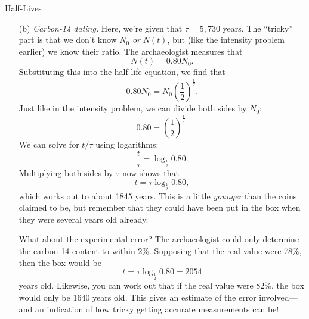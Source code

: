 \documentclass[12pt]{article}
\begin{document}
\begin{probdesc}{7}{Half-Lives}
\begin{enumerate}
\item[(b)] {\em Carbon-14 dating.} Here, we're given that $\tau =
  5,730$ years.  The ``tricky'' part is that we don't know $N_0$ {\em
  or} $N(t)$, but (like the intensity problem earlier) we know their
  ratio.  The archaeologist measures that
\begin{equation}
N(t) = 0.80 N_0.
\end{equation}
Substituting this into the half-life equation, we find that
\begin{equation}
0.80 N_0 = N_0 \left(\frac{1}{2}\right)^{\frac{t}{\tau}}.
\end{equation}
Just like in the intensity problem, we can divide both sides by $N_0$:
\begin{equation}
0.80 = \left(\frac{1}{2}\right)^{\frac{t}{\tau}}.
\end{equation}
We can solve for $t/\tau$ using logarithms:
\begin{equation}
\frac{t}{\tau} = \log_{\frac{1}{2}} 0.80.
\end{equation}
Multiplying both sides by $\tau$ now shows that
\begin{equation}
t = \tau \log_{\frac{1}{2}} 0.80,
\end{equation}
which works out to about 1845 years.  This is a little {\em younger}
than the coins claimed to be, but remember that they could have been
put in the box when they were several years old already.

What about the experimental error?  The archaeologist could only
determine the carbon-14 content to within 2\%.  Supposing that the
real value were 78\%, then the box would be
\begin{equation}
t = \tau \log_{\frac{1}{2}} 0.80 = 2054
\end{equation}
years old.  Likewise, you can work out that if the real value were
82\%, the box would only be 1640 years old.  This gives an estimate of
the error involved---and an indication of how tricky getting accurate
measurements can be!


\end{enumerate}
\end{probdesc}
\end{document}

